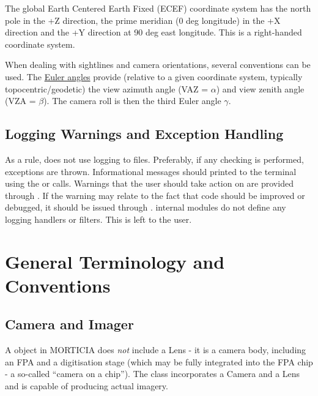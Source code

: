 \documentclass[a4paper,10pt,english]{sphinxmanual}
\begin{document}
The global Earth Centered Earth Fixed (ECEF) coordinate system has the north pole in the +Z direction, the prime
meridian (0 deg longitude) in the +X direction and the +Y direction at 90 deg east longitude. This is a right-handed
coordinate system.

When dealing with sightlines and camera orientations, several conventions can be used. The
\href{https://en.wikipedia.org/wiki/Euler\_angles}{Euler angles} provide (relative to a given coordinate system,
typically topocentric/geodetic) the view azimuth angle (VAZ = \(\alpha\)) and view zenith angle (VZA =
\(\beta\)). The camera roll is then the third Euler angle \(\gamma\).


\subsection{Logging Warnings and Exception Handling}
\label{styleguide:logging-warnings-and-exception-handling}
As a rule,  does not use logging to files. Preferably, if any checking is performed, exceptions are thrown.
Informational messages should printed to the terminal using the  or  calls.
Warnings that the user should take action on are provided through . If the warning may relate to
the fact that  code should be improved or debugged, it should be issued through .
 internal modules do not define any logging handlers or filters. This is left to the user.


\section{General Terminology and Conventions}
\label{styleguide:general-terminology-and-conventions}

\subsection{Camera and Imager}
\label{styleguide:camera-and-imager}
A  object in MORTICIA does \emph{not} include a Lens - it is a camera body, including an FPA and a
digitisation stage (which may be fully integrated into the FPA chip - a so-called ``camera on a chip'').
The  class incorporates a Camera and a Lens and is capable of producing actual imagery.
\end{document}
